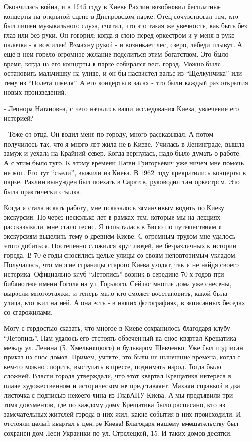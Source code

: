 Окончилась война, и в 1945 году в Киеве Рахлин возобновил бесплатные концерты
на открытой сцене в Днепровском парке. Отец сочувствовал тем, кто был лишен
музыкального слуха, считал, что это такая же увечность, как быть без глаз или
без руки. Он говорил: когда я стою перед оркестром и у меня в руке палочка - я
всесилен! Взмахну рукой - и возникает лес, озеро, лебеди плывут. А еще в нем
горело огромное желание поделиться этим богатством. Это было время, когда на
его концерты в парке собирался весь город. Можно было остановить мальчишку на
улице, и он бы насвистел вальс из \enquote{Щелкунчика} или тему из \enquote{Полета шмеля}. А
его концерты в залах - это были каждый раз открытия новых произведений. 

- Леонора Натановна, с чего начались ваши исследования Киева, увлечение его
историей?

- Тоже от отца. Он водил меня по городу, много рассказывал. А потом получилось
так, что я много лет жила не в Киеве. Училась в Ленинграде, вышла замуж и
уехала на Крайний север. Когда вернулась, надо было думать о работе. А с этим
было туго. К этому времени Натан Григорьевич уже ничем мне помочь не мог. Его
тут \enquote{съели}, выжили из Киева. В 1962 году прекратились концерты в парке. Рахлин
вынужден был поехать в Саратов, руководил там оркестром. Это была практически
ссылка. 

Когда я стала искать работу, мне показалось заманчивым водить по Киеву
экскурсии. Но через несколько лет в рамках тем, которые мы на лекциях
рассказывали, мне стало тесно. Я попыталась в Бюро по путешествиям и экскурсиям
выделить тему о древнем Киеве. С огромным трудом мне удалось этого добиться.
Постепенно сложился круг людей, не безразличных к истории города. В 70-е годы
сносились целые улицы со своим неповторимым укладом. Получалось, что многие
страницы старого Киева уходят, так и не найдя своего историка. Официально клуб
\enquote{Летопись} возник в середине 70-х годов при библиотеке имени Гоголя на ул.
Горького. Сейчас многие дома уже снесены, выросли многоэтажки, и теперь мало
кто сможет восстановить, какой была улица, кто жил на ней. А она есть - в наших
фотографиях, в записанных беседах со старожилами. 

Могу с гордостью сказать, что многое в Киеве сохранилось благодаря клубу
\enquote{Летопись}. Нам удалось его отстоять обреченный на снос квартал Крещатика между
ул. Ленина (Б. Хмельницкого) и бульваром Шевченко. Уже был подписан приказ на
снос домов. Причем, учтите, это были не нынешние времена, когда с кем-то можно
спорить, выступать в прессе, поднимать народ. Тогда было сложней. Власти города
утверждали, что этот квартал Крещатика интереса в плане художественном и
историческом не представляет. Махали справкой в два листочка с подписью некоего
чина из ГлавАПУ Киева. А мы предъявили три тома документов, где по каждому дому
Крещатика было расписано, кто из замечательных жителей города в них жил, какие
события в них происходили. И – отстояли целый квартал в центре Киева! Благодаря
нашему вмешательству был сохранен дом Леси Украинки по ул. Стрелецкой, 15. И
таких домов десятки. 

